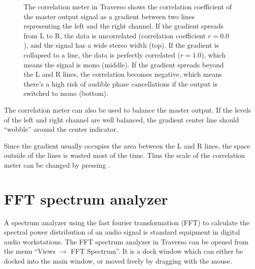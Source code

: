 \begin{figure}
	\centering
	\caption{The correlation meter in Traverso shows the correlation coefficient of the master output signal as a gradient between two lines representing the left and the right channel. If the gradient spreads from L to R, the data is uncorrelated (correlation coefficient $r = 0.0$), and the signal has a wide stereo width (top). If the gradient is collapsed to a line, the data is perfectly correlated ($r = 1.0$), which means the signal is mono (middle). If the gradient spreads beyond the L and R lines, the correlation becomes negative, which means there's a high risk of audible phase cancellations if the output is switched to mono (bottom).}
	\label{fig_cmeter01}
\end{figure}

The correlation meter can also be used to balance the master output. If the levels of the left and right channel are well balanced, the gradient center line should ``wobble'' around the center indicator.

Since the gradient usually occupies the area between the L and R lines, the space outside of the lines is  wasted most of the time. Thus the scale of the correlation meter can be changed by pressing .

\section{FFT spectrum analyzer}
A spectrum analyzer using the fast fourier transformation (FFT) to calculate the spectral power distribution of an audio signal is standard equipment in digital audio workstations. The FFT spectrum analyzer in Traverso can be opened from the menu ``Views $\rightarrow$ FFT Spectrum''. It is a dock window which can either be docked into the main window, or moved freely by dragging with the mouse.

